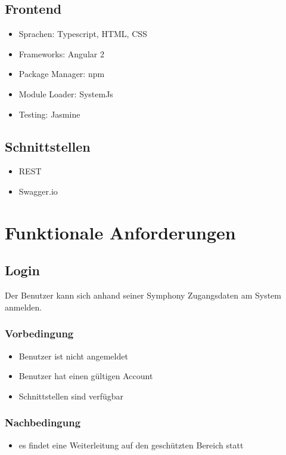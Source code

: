 \documentclass[a4paper,12pt]{article}
\begin{document}
\subsection{Frontend}
\begin{itemize}
\item
  Sprachen: Typescript, HTML, CSS
\item
  Frameworks: Angular 2
\item
  Package Manager: npm
\item
  Module Loader: SystemJs
\item
  Testing: Jasmine
\end{itemize}

\subsection{Schnittstellen}

\begin{itemize}
\item
  REST
\item Swagger.io
\end{itemize}

\section{Funktionale Anforderungen}
\subsection{Login}\label{login}
Der Benutzer kann sich anhand seiner Symphony Zugangsdaten am System anmelden.

\subsubsection{Vorbedingung}\label{vorbedingung}

\begin{itemize}
\item
  Benutzer ist nicht angemeldet
\item
  Benutzer hat einen gültigen Account
\item
  Schnittstellen sind verfügbar
\end{itemize}

\subsubsection{Nachbedingung}\label{nachbedingung}

\begin{itemize}
\item
  es findet eine Weiterleitung auf den geschützten Bereich statt
\end{itemize}
\end{document}
